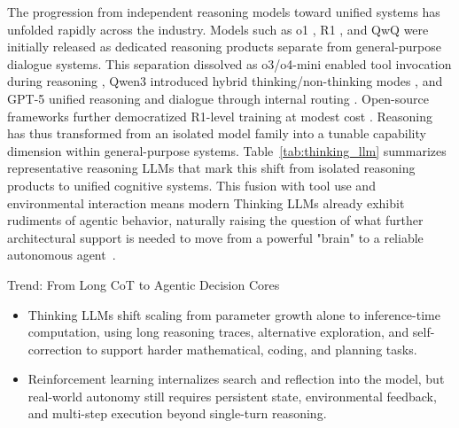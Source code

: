 The progression from independent reasoning models toward unified systems has unfolded rapidly across the industry. Models such as o1 \cite{openai2024o1}, R1 \cite{deepseek2025r1}, and QwQ \cite{qwen2025qwq32b} were initially released as dedicated reasoning products separate from general-purpose dialogue systems. This separation dissolved as o3/o4-mini enabled tool invocation during reasoning \cite{openai2025o3o4mini}, Qwen3 introduced hybrid thinking/non-thinking modes \cite{qwen2025qwen3}, and GPT-5 unified reasoning and dialogue through internal routing \cite{openai2025gpt5systemcard}. Open-source frameworks further democratized R1-level training at modest cost \cite{li2025system1system2}. Reasoning has thus transformed from an isolated model family into a tunable capability dimension within general-purpose systems. Table~\ref{tab:thinking_llm} summarizes representative reasoning LLMs that mark this shift from isolated reasoning products to unified cognitive systems. This fusion with tool use and environmental interaction means modern Thinking LLMs already exhibit rudiments of agentic behavior, naturally raising the question of what further architectural support is needed to move from a powerful "brain" to a reliable autonomous agent~\citep{yu2025formalmath,li2023chain,lin2026scaling,alon2025integrating,liu2025revisiting}.


\begin{AIbox}{Trend: From Long CoT to Agentic Decision Cores}
    \begin{itemize}[left=2pt,topsep=1pt,itemsep=2pt, parsep=1pt]
        \item Thinking LLMs shift scaling from parameter growth alone to inference-time computation, using long reasoning traces, alternative exploration, and self-correction to support harder mathematical, coding, and planning tasks.

        \item Reinforcement learning internalizes search and reflection into the model, but real-world autonomy still requires persistent state, environmental feedback, and multi-step execution beyond single-turn reasoning.
    \end{itemize}
\end{AIbox}
